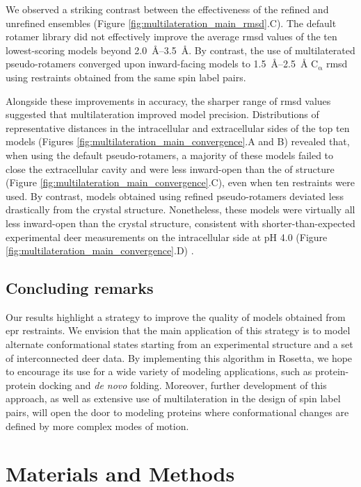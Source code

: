 We observed a striking contrast between the effectiveness of the refined and unrefined ensembles (Figure \ref{fig:multilateration_main_rmsd}.C). The default rotamer library did not effectively improve the average \gls{rmsd} values of the ten lowest-scoring models beyond \SIrange{2.0}{3.5}{\angstrom}. By contrast, the use of multilaterated pseudo-rotamers converged upon inward-facing models to \SIrange{1.5}{2.5}{\angstrom} $\mathrm{C_{\upalpha}}$ \gls{rmsd} using restraints obtained from the same spin label pairs.

Alongside these improvements in accuracy, the sharper range of \gls{rmsd} values suggested that multilateration improved model precision. Distributions of representative distances in the intracellular and extracellular sides of the top ten models (Figures \ref{fig:multilateration_main_convergence}.A and B) revealed that, when using the default pseudo-rotamers, a majority of these models failed to close the extracellular cavity and were less inward-open than the \gls{of} structure (Figure \ref{fig:multilateration_main_convergence}.C), even when ten restraints were used. By contrast, models obtained using refined pseudo-rotamers deviated less drastically from the crystal structure. Nonetheless, these models were virtually all less inward-open than the crystal structure, consistent with shorter-than-expected experimental \gls{deer} measurements on the intracellular side at pH 4.0 (Figure \ref{fig:multilateration_main_convergence}.D) \citep*{Jagessar2020} .


\subsection{Concluding remarks}

Our results highlight a strategy to improve the quality of models obtained from \gls{epr} restraints. We envision that the main application of this strategy is to model alternate conformational states starting from an experimental structure and a set of interconnected \gls{deer} data. By implementing this algorithm in Rosetta, we hope to encourage its use for a wide variety of modeling applications, such as protein-protein docking and \emph{de novo} folding. Moreover, further development of this approach, as well as extensive use of multilateration in the design of spin label pairs, will open the door to modeling proteins where conformational changes are defined by more complex modes of motion.

\section{Materials and Methods}\label{sec:multilateration_main_methods}

